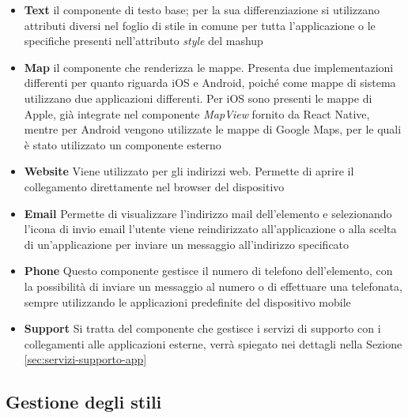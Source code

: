 \begin{itemize}
	\item \textbf{Text}
	\upe il componente di testo base; per la sua differenziazione si utilizzano attributi diversi nel foglio di stile in comune per tutta l'applicazione o le specifiche presenti nell'attributo \emph{style} del mashup
	\item \textbf{Map}
	\upe il componente che renderizza le mappe. Presenta due implementazioni differenti per quanto riguarda iOS e Android, poiché come mappe di sistema utilizzano due applicazioni differenti. Per iOS sono presenti le mappe di Apple, già integrate nel componente \emph{MapView} fornito da React Native, mentre per Android vengono utilizzate le mappe di Google Maps, per le quali è stato utilizzato un componente esterno
	\item \textbf{Website}
	Viene utilizzato per gli indirizzi web. Permette di aprire il collegamento direttamente nel browser del dispositivo
	\item \textbf{Email}
	Permette di visualizzare l'indirizzo mail dell'elemento e selezionando l'icona di invio email l'utente viene reindirizzato all'applicazione o alla scelta di un'applicazione per inviare un messaggio all'indirizzo specificato
	\item \textbf{Phone}
	Questo componente gestisce il numero di telefono dell'elemento, con la possibilità di inviare un messaggio al numero o di effettuare una telefonata, sempre utilizzando le applicazioni predefinite del dispositivo mobile
	\item \textbf{Support}
	Si tratta del componente che gestisce i servizi di supporto con i collegamenti alle applicazioni esterne, verrà spiegato nei dettagli nella Sezione \ref{sec:servizi-supporto-app}
\end{itemize}

\subsection{Gestione degli stili}

